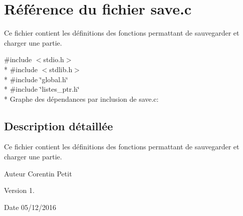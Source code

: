 \hypertarget{a00026}{}\section{Référence du fichier save.\+c}
\label{a00026}


Ce fichier contient les définitions des fonctions permattant de sauvegarder et charger une partie.  


{\ttfamily \#include $<$stdio.\+h$>$}\\*
{\ttfamily \#include $<$stdlib.\+h$>$}\\*
{\ttfamily \#include \char`\"{}global.\+h\char`\"{}}\\*
{\ttfamily \#include \char`\"{}listes\+\_\+ptr.\+h\char`\"{}}\\*
Graphe des dépendances par inclusion de save.\+c\+:


\subsection{Description détaillée}
Ce fichier contient les définitions des fonctions permattant de sauvegarder et charger une partie. 

\begin{DoxyAuthor}{Auteur}
Corentin Petit 
\end{DoxyAuthor}
\begin{DoxyVersion}{Version}
1. 
\end{DoxyVersion}
\begin{DoxyDate}{Date}
05/12/2016 
\end{DoxyDate}
